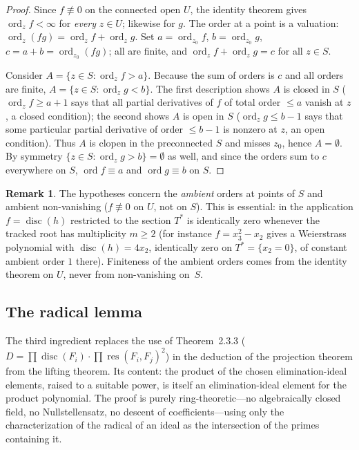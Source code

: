 \documentclass[11pt,a4paper]{article}
\theoremstyle{plain}
\theoremstyle{definition}
\newtheorem{remark}[theorem]{Remark}
\DeclareMathOperator{\ord}{ord}
\DeclareMathOperator{\res}{res}
\DeclareMathOperator{\disc}{disc}
\begin{document}
\begin{proof}
Since $f\not\equiv 0$ on the connected open $U$, the identity theorem gives
$\ord_z f<\infty$ for \emph{every} $z\in U$; likewise for $g$. The order at a
point is a valuation: $\ord_z(fg)=\ord_z f+\ord_z g$. Set $a=\ord_{z_0}f$,
$b=\ord_{z_0}g$, $c=a+b=\ord_{z_0}(fg)$; all are finite, and
$\ord_z f+\ord_z g=c$ for all $z\in S$.

Consider $A=\{z\in S:\ord_z f>a\}$. Because the sum of orders is $c$ and all
orders are finite, $A=\{z\in S:\ord_z g<b\}$. The first description shows $A$
is closed in $S$ ($\ord_z f\ge a+1$ says that all partial derivatives of $f$
of total order $\le a$ vanish at $z$, a closed condition); the second shows
$A$ is open in $S$ ($\ord_z g\le b-1$ says that some particular partial
derivative of order $\le b-1$ is nonzero at $z$, an open condition). Thus $A$
is clopen in the preconnected $S$ and misses $z_0$, hence $A=\emptyset$. By
symmetry $\{z\in S:\ord_z g>b\}=\emptyset$ as well, and since the orders sum
to $c$ everywhere on $S$, $\ord f\equiv a$ and $\ord g\equiv b$ on $S$.
\end{proof}

\begin{remark}\label{rem:ambient}
The hypotheses concern the \emph{ambient} orders at points of $S$ and ambient
non-vanishing ($f\not\equiv0$ on $U$, not on $S$). This is essential: in the
application $f=\disc(h)$ restricted to the section $T^*$ is identically zero
whenever the tracked root has multiplicity $m\ge 2$ (for instance
$f=x_3^2-x_2$ gives a Weierstrass polynomial with $\disc(h)=4x_2$, identically
zero on $T^*=\{x_2=0\}$, of constant ambient order $1$ there). Finiteness of
the ambient orders comes from the identity theorem on $U$, never from
non-vanishing on~$S$.
\end{remark}

\subsection{The radical lemma}\label{ssec:radical}

The third ingredient replaces the use of Theorem~2.3.3
($D=\prod\disc(F_i)\cdot\prod\res(F_i,F_j)^2$) in the deduction of the
projection theorem from the lifting theorem. Its content: the product of the
chosen elimination-ideal elements, raised to a suitable power, is itself an
elimination-ideal element for the product polynomial. The proof is purely
ring-theoretic---no algebraically closed field, no Nullstellensatz, no descent
of coefficients---using only the characterization of the radical of an ideal
as the intersection of the primes containing it.
\end{document}
